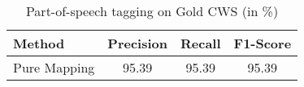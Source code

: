 \begin{table}[htbp!]
    \centering
    \begin{tabular}{lccc}
    \toprule
        Method         & Precision     & Recall   & F1-Score \\
    \midrule
        Pure Mapping   & 95.39         & 95.39    & 95.39    \\
    \bottomrule
    \end{tabular}
\caption{Part-of-speech tagging on Gold CWS (in \%)}
\label{tab:pos_on_gold_cws}
\end{table}